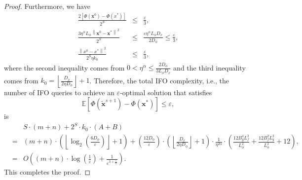 \documentclass[11pt]{article}
\newcommand{\BE}{\mathbb{E}}
\newcommand{\x}{\mathbf x}
\begin{document}
\begin{proof}
Furthermore, we have
\begin{eqnarray*}
\frac{2\left[\Phi(\x^0)-\Phi(x^*)\right]}{2^S} & \leq & \frac{\varepsilon}{3}, \\
\frac{3 \eta^\alpha L_\phi \left\| \x^0 - \x^*\right\|^2}{2^S} & \leq & \frac{\varepsilon\eta^{\alpha} L_\phi D_x}{2D_\phi} \leq \frac{\varepsilon}{3}, \\
\frac{\left\| x^0 - x^* \right\|^2}{2^S\eta k_0} & \leq & \frac{\varepsilon}{3}, 
\end{eqnarray*}
where the second inequality comes from $0<\eta^\alpha\leq\frac{2D_\phi}{3L_\phi D_x}$ and the third inequality comes from $k_0 = \left\lfloor \frac{D_x}{2 \eta D_\phi} \right\rfloor + 1$. Therefore, the total IFO complexity, i.e., the number of IFO queries to achieve an $\varepsilon$-optimal solution that satisfies
\begin{equation*}
\BE\left[\Phi(\tilde{\x}^{s+1}) - \Phi(\x^*)\right] \leq \varepsilon, 
\end{equation*}
is
\begin{eqnarray*}
& & S\cdot \left(m+n\right) + 2^S\cdot k_0 \cdot \left(A + B \right) \\
& = & \left(m+n\right) \cdot \left(\left\lfloor\log_2\left(\frac{6D_\phi}{\varepsilon}\right) \right\rfloor + 1\right) + \left(\frac{12D_\phi}{\varepsilon}\right)\cdot \left(\left\lfloor \frac{D_x}{2 \eta D_\phi} \right\rfloor + 1\right) \cdot \frac{1}{\eta^{2\alpha}} \cdot \left( \frac{12 B_g^4 L_f^2}{L_\phi^2}+\frac{12 B_f^2 L_g^2}{L_\phi^2}+12\right), \\
& = & O\left(\left(m+n\right)\cdot\log\left(\frac{1}{\varepsilon}\right) + \frac{1}{\varepsilon^{3+\frac{1}{\alpha}}}\right). 
\end{eqnarray*}
This completes the proof. 
\end{proof}
\end{document}

